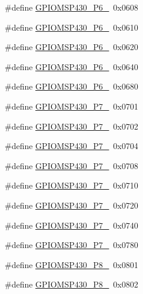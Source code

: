 \begin{DoxyCompactItemize}
\item 
\#define \hyperlink{_g_p_i_o_m_s_p430_8h_af0144a4763c2811e642328095685d3d0}{G\+P\+I\+O\+M\+S\+P430\+\_\+\+P6\+\_}~0x0608
\item 
\#define \hyperlink{_g_p_i_o_m_s_p430_8h_aa7ca2a41d798e90f95cd2205bde88750}{G\+P\+I\+O\+M\+S\+P430\+\_\+\+P6\+\_}~0x0610
\item 
\#define \hyperlink{_g_p_i_o_m_s_p430_8h_a55eefc6135d22fc348d53416f68d3bae}{G\+P\+I\+O\+M\+S\+P430\+\_\+\+P6\+\_}~0x0620
\item 
\#define \hyperlink{_g_p_i_o_m_s_p430_8h_a6a6c7c24d6d8c988c2a54ea422774b5a}{G\+P\+I\+O\+M\+S\+P430\+\_\+\+P6\+\_}~0x0640
\item 
\#define \hyperlink{_g_p_i_o_m_s_p430_8h_a1bcfe57e993e1507ab85e1fe14fd1ef1}{G\+P\+I\+O\+M\+S\+P430\+\_\+\+P6\+\_}~0x0680
\item 
\#define \hyperlink{_g_p_i_o_m_s_p430_8h_a6ddac930e6eee916e49463b87014274f}{G\+P\+I\+O\+M\+S\+P430\+\_\+\+P7\+\_}~0x0701
\item 
\#define \hyperlink{_g_p_i_o_m_s_p430_8h_a2ed7d991df742665da8d5bf6732d8093}{G\+P\+I\+O\+M\+S\+P430\+\_\+\+P7\+\_}~0x0702
\item 
\#define \hyperlink{_g_p_i_o_m_s_p430_8h_a52402c3fb7650b9cae7ad0c58a48f8a3}{G\+P\+I\+O\+M\+S\+P430\+\_\+\+P7\+\_}~0x0704
\item 
\#define \hyperlink{_g_p_i_o_m_s_p430_8h_a69e976c339a486e0d715b411b900d7ea}{G\+P\+I\+O\+M\+S\+P430\+\_\+\+P7\+\_}~0x0708
\item 
\#define \hyperlink{_g_p_i_o_m_s_p430_8h_aa47495dccbb6281b93eaa1829cce72a8}{G\+P\+I\+O\+M\+S\+P430\+\_\+\+P7\+\_}~0x0710
\item 
\#define \hyperlink{_g_p_i_o_m_s_p430_8h_ab4b77acbd27bda065ec0a394b9fa8c97}{G\+P\+I\+O\+M\+S\+P430\+\_\+\+P7\+\_}~0x0720
\item 
\#define \hyperlink{_g_p_i_o_m_s_p430_8h_aa201c06c20c331bfca69b19ff1529176}{G\+P\+I\+O\+M\+S\+P430\+\_\+\+P7\+\_}~0x0740
\item 
\#define \hyperlink{_g_p_i_o_m_s_p430_8h_a5dc607e706162060c943c44cb8a57503}{G\+P\+I\+O\+M\+S\+P430\+\_\+\+P7\+\_}~0x0780
\item 
\#define \hyperlink{_g_p_i_o_m_s_p430_8h_a9cc9b1accc2159bbc1d92f4019cf460b}{G\+P\+I\+O\+M\+S\+P430\+\_\+\+P8\+\_}~0x0801
\item 
\#define \hyperlink{_g_p_i_o_m_s_p430_8h_a7e14f64d9a5009ae3208554221171023}{G\+P\+I\+O\+M\+S\+P430\+\_\+\+P8\+\_}~0x0802
\item 

\end{DoxyCompactItemize}

